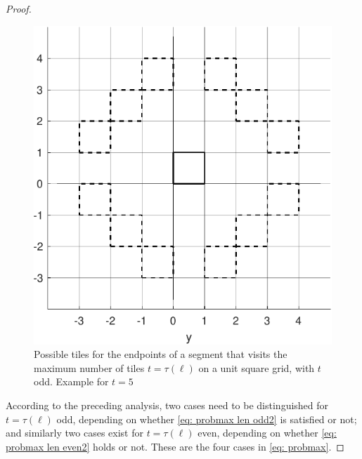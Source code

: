 \documentclass[12pt, a4paper]{article}
\newcommand{\funt}{\tau} %
\newcommand{\len}{\ell} %
\newcommand{\tiles}{t} %
\begin{document}
\begin{proof}
\begin{figure}
\centering%
\includegraphics[width=.52\textwidth]{probmax_possible_tiles}%
\caption{Possible tiles for the endpoints of a segment that visits the maximum number of tiles $\tiles= \funt(\len)$ on a unit square grid, with $\tiles$ odd. Example for $\tiles = 5$%
}%
\label{fig: probmax_possible_tiles}%
\end{figure}%

According to the preceding analysis, two cases need to be distinguished for $\tiles = \funt(\len)$ odd, depending on whether \eqref{eq: probmax len odd2} is satisfied or not; and similarly two cases exist for $\tiles = \funt(\len)$ even, depending on whether \eqref{eq: probmax len even2} holds or not. These are the four cases in \eqref{eq: probmax}.


\end{proof}
\end{document}

